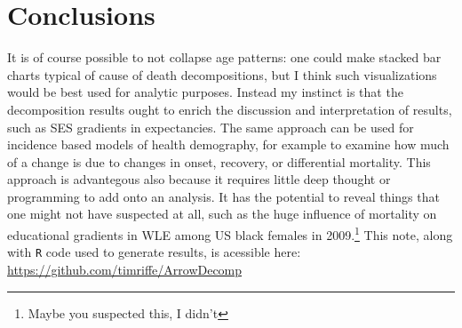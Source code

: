 \documentclass{article}
\begin{document}
\section{Conclusions}
It is of course possible to not collapse age patterns: one could make stacked
bar charts typical of cause of death decompositions, but I think such
visualizations would be best used for analytic purposes. Instead my instinct is
that the decomposition results ought to enrich the discussion and interpretation
of results, such as SES gradients in expectancies. The same approach can be used
for incidence based models of health demography, for example to examine how much
of a change is due to changes in onset, recovery, or differential mortality.
This approach is advantegous also because it requires little deep thought or
programming to add onto an analysis. It has the potential to reveal things that
one might not have suspected at all, such as the huge influence of mortality on
educational gradients in WLE among US black females in 2009.\footnote{Maybe you
suspected this, I didn't} This note, along with \texttt{R} code used to generate
results, is acessible here:\\ \url{https://github.com/timriffe/ArrowDecomp}


\singlespacing

   
\end{document}
